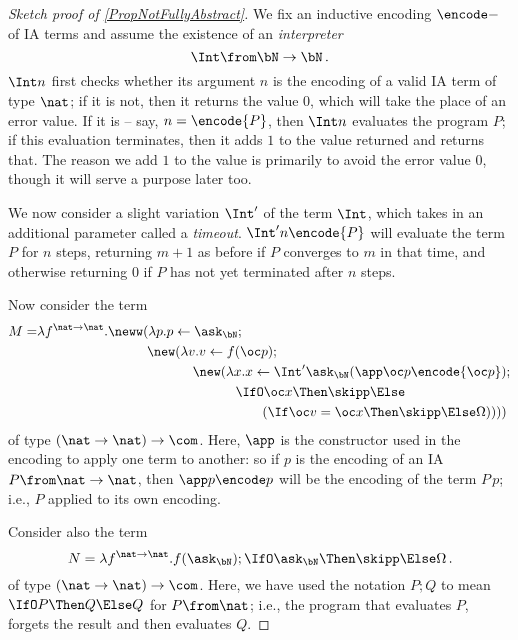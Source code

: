 \begin{proof}[Sketch proof of \ref{PropNotFullyAbstract}]
  We fix an inductive encoding $\encode -$ of IA terms and assume the existence of an \emph{interpreter}
  \[
    \Int \from \bN \to \bN\,.
    \]
  $\Int n$ first checks whether its argument $n$ is the encoding of a valid IA term of type $\nat$; if it is not, then it returns the value $0$, which will take the place of an error value.
  If it is -- say, $n=\encode{P}$, then $\Int n$ evaluates the program $P$; if this evaluation terminates, then it adds $1$ to the value returned and returns that.  
  The reason we add $1$ to the value is primarily to avoid the error value $0$, though it will serve a purpose later too.

  We now consider a slight variation $\Int'$ of the term $\Int$, which takes in an additional parameter called a \emph{timeout}.  
  $\Int' n \encode{P}$ will evaluate the term $P$ for $n$ steps, returning $m+1$ as before if $P$ converges to $m$ in that time, and otherwise returning $0$ if $P$ has not yet terminated after $n$ steps.

  Now consider the term
  \setlength{\jot}{0pt}%
  \begin{align*}
    M=&\lambda f^{\nat \to \nat} .\neww(\lambda p.p\gets\ask_\bN;\\
      &\hspace{82pt}\new(\lambda v.v\gets f(\oc p);\\
        &\hspace{116pt}\new(\lambda x.x\gets \Int' \ask_\bN (\app \oc p \encode {\oc p});\\
          &\hspace{148pt}\IfO \oc x \Then \skipp \Else\\
            &\hspace{168pt}(\If \oc v = \oc x \Then \skipp \Else \Omega))))
  \end{align*}
  of type $(\nat\to \nat) \to \com$.
  Here, $\app$ is the constructor used in the encoding to apply one term to another: so if $p$ is the encoding of an IA $P\from \nat \to \nat$, then $\app p \encode p$ will be the encoding of the term $P\,p$; i.e., $P$ applied to its own encoding.

  Consider also the term
  \[
    N = \lambda f^{\nat \to \nat}.f(\ask_\bN);\IfO \ask_\bN \Then \skipp \Else \Omega\,.
    \]
  of type $(\nat \to \nat) \to \com$.  
  Here, we have used the notation $P;Q$ to mean $\IfO P \Then Q \Else Q$ for $P\from \nat$; i.e., the program that evaluates $P$, forgets the result and then evaluates $Q$.


\end{proof}
